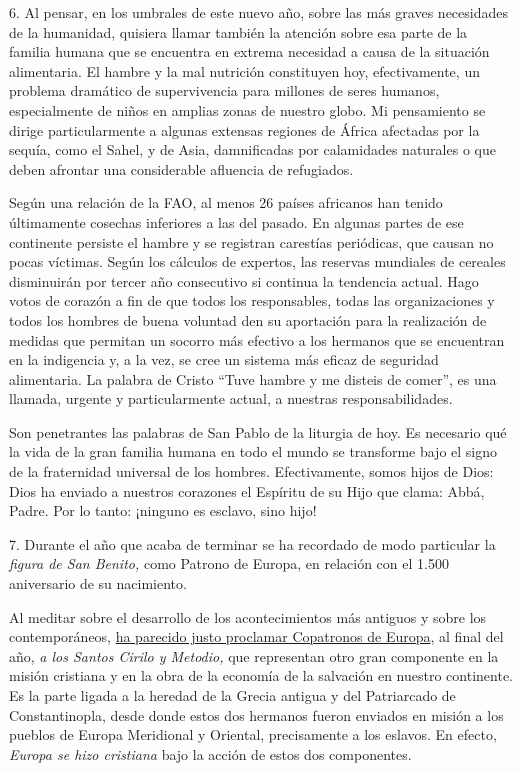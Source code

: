 6. Al pensar, en los umbrales de este nuevo año, sobre las más graves
necesidades de la humanidad, quisiera llamar también la atención sobre
esa parte de la familia humana que se encuentra en extrema necesidad a
causa de la situación alimentaria. El hambre y la mal nutrición
constituyen hoy, efectivamente, un problema dramático de supervivencia
para millones de seres humanos, especialmente de niños en amplias zonas
de nuestro globo. Mi pensamiento se dirige particularmente a algunas
extensas regiones de África afectadas por la sequía, como el Sahel, y de
Asia, damnificadas por calamidades naturales o que deben afrontar una
considerable afluencia de refugiados.

Según una relación de la FAO, al menos 26 países africanos han tenido
últimamente cosechas inferiores a las del pasado. En algunas partes de
ese continente persiste el hambre y se registran carestías periódicas,
que causan no pocas víctimas. Según los cálculos de expertos, las
reservas mundiales de cereales disminuirán por tercer año consecutivo si
continua la tendencia actual. Hago votos de corazón a fin de que todos
los responsables, todas las organizaciones y todos los hombres de buena
voluntad den su aportación para la realización de medidas que permitan
un socorro más efectivo a los hermanos que se encuentran en la
indigencia y, a la vez, se cree un sistema más eficaz de seguridad
alimentaria. La palabra de Cristo ``Tuve hambre y me disteis de comer'',
es una llamada, urgente y particularmente actual, a nuestras
responsabilidades.

Son penetrantes las palabras de San Pablo de la liturgia de hoy. Es
necesario qué la vida de la gran familia humana en todo el mundo se
transforme bajo el signo de la fraternidad universal de los hombres.
Efectivamente, somos hijos de Dios: Dios ha enviado a nuestros corazones
el Espíritu de su Hijo que clama: Abbá, Padre. Por lo tanto: ¡ninguno es
esclavo, sino hijo!

7. Durante el año que acaba de terminar se ha recordado de modo
particular la \emph{figura de San Benito,} como Patrono de Europa, en
relación con el 1.500 aniversario de su nacimiento.

Al meditar sobre el desarrollo de los acontecimientos más antiguos y
sobre los contemporáneos,
\href{http://w2.vatican.va/content/john-paul-ii/es/apost_letters/1980/documents/hf_jp-ii_apl_31121980_egregiae-virtutis.html}{ha
	parecido justo proclamar Copatronos de Europa}, al final del año,
\emph{a los Santos Cirilo y Metodio,} que representan otro gran
componente en la misión cristiana y en la obra de la economía de la
salvación en nuestro continente. Es la parte ligada a la heredad de la
Grecia antigua y del Patriarcado de Constantinopla, desde donde estos
dos hermanos fueron enviados en misión a los pueblos de Europa
Meridional y Oriental, precisamente a los eslavos. En efecto,
\emph{Europa se hizo cristiana} bajo la acción de estos dos componentes.

